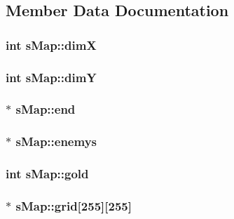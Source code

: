 \subsection{Member Data Documentation}
\hypertarget{structs_map_a9ba71dc7a7b6eeb28048a66493c620d4}{}
\subsubsection[{dim\+X}]{\setlength{\rightskip}{0pt plus 5cm}int s\+Map\+::dim\+X}\label{structs_map_a9ba71dc7a7b6eeb28048a66493c620d4}
\hypertarget{structs_map_a3f0d31fe9f43386379f2eece819cad01}{}
\subsubsection[{dim\+Y}]{\setlength{\rightskip}{0pt plus 5cm}int s\+Map\+::dim\+Y}\label{structs_map_a3f0d31fe9f43386379f2eece819cad01}
\hypertarget{structs_map_af32a1725ce537428fb1927a1fbb967fd}{}
\subsubsection[{end}]{$\ast$ s\+Map\+::end}\label{structs_map_af32a1725ce537428fb1927a1fbb967fd}
\hypertarget{structs_map_a7319b51da24fb022fa90806e9cd7bd76}{}
\subsubsection[{enemys}]{$\ast$ s\+Map\+::enemys}\label{structs_map_a7319b51da24fb022fa90806e9cd7bd76}
\hypertarget{structs_map_a2751a189d93f2aead4161dab37878ff2}{}
\subsubsection[{gold}]{\setlength{\rightskip}{0pt plus 5cm}int s\+Map\+::gold}\label{structs_map_a2751a189d93f2aead4161dab37878ff2}
\hypertarget{structs_map_a5c09c94b17e9241ec28aba0407808aff}{}
\subsubsection[{grid}]{$\ast$ s\+Map\+::grid\mbox{[}255\mbox{]}\mbox{[}255\mbox{]}}\label{structs_map_a5c09c94b17e9241ec28aba0407808aff}
\hypertarget{structs_map_a7ac656eb61c1fd86f15eb6a36df144e8}{}

